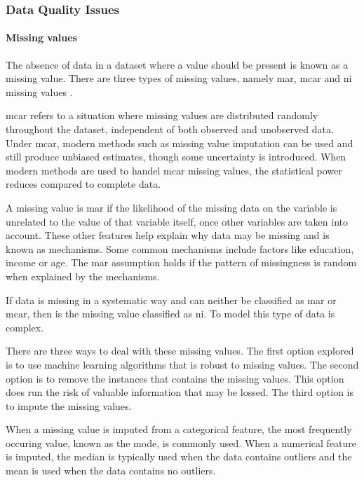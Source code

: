\documentclass[10pt, conference]{IEEEtran}
\begin{document}
\subsubsection{Data Quality Issues}

\paragraph{Missing values}

The absence of data in a dataset where a value should be present is known as a missing value. There are
three types of missing values, namely \acrfull{mar}, \acrfull{mcar} and \acrfull{ni} missing values \cite{Missing_ref}.

\acrshort{mcar} refers to a situation where missing values are distributed randomly throughout the dataset, independent
of both observed and unobserved data. Under \acrshort{mcar}, modern methods such as missing value imputation can be
used and still produce unbiased estimates, though some uncertainty is introduced. When modern methods are used
to handel \acrshort{mcar} missing values, the statistical power reduces compared to complete data.

A missing value is \acrshort{mar} if the likelihood of the missing data on the variable is unrelated to the value of
that variable itself, once other variables are taken into account. These other features help explain why data may
be missing and is known as mechanisms. Some common mechanisms include factors like education, income or age.
The \acrshort{mar} assumption holds if the pattern of missingness is random when explained by the mechanisms.

If data is missing in a systematic way and can neither be classified as \acrshort{mar} or \acrshort{mcar}, then
is the missing value classified as \acrshort{ni}. To model this type of data is complex.

There are three ways to deal with these missing values. The first option explored is to use machine learning
algorithms that is robust to missing values. The second option is to remove the instances that contains the
missing values. This option does run the risk of valuable information that may be lossed. The third option
is to impute the missing values.

When a missing value is imputed from a categorical feature, the most frequently occuring value, known as the mode,
is commonly used. When a numerical feature is imputed, the median is typically used when the data contains outliers
and the mean is used when the data contains no outliers. 
\end{document}
